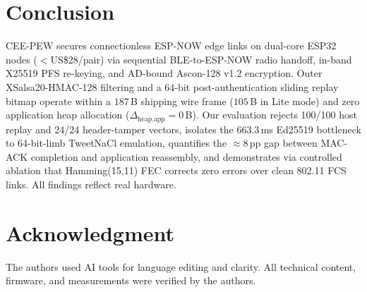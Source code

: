 \documentclass[conference]{IEEEtran}
\begin{document}
\section{Conclusion}
CEE-PEW secures connectionless ESP-NOW edge links on dual-core ESP32 nodes ($<$US\$28/pair) via sequential BLE-to-ESP-NOW radio handoff, in-band X25519 PFS re-keying, and AD-bound Ascon-128 v1.2 encryption. Outer XSalsa20-HMAC-128 filtering and a 64-bit post-authentication sliding replay bitmap operate within a $187$\,B shipping wire frame ($105$\,B in Lite mode) and zero application heap allocation ($\Delta_{\text{heap,app}}=0$\,B). Our evaluation rejects 100/100 host replay and 24/24 header-tamper vectors, isolates the $663.3$\,ms Ed25519 bottleneck to 64-bit-limb TweetNaCl emulation, quantifies the $\approx 8$\,pp gap between MAC-ACK completion and application reassembly, and demonstrates via controlled ablation that Hamming(15,11) FEC corrects zero errors over clean 802.11 FCS links. All findings reflect real hardware.

\section*{Acknowledgment}
The authors used AI tools for language editing and clarity. All technical content, firmware, and measurements were verified by the authors.
\end{document}

